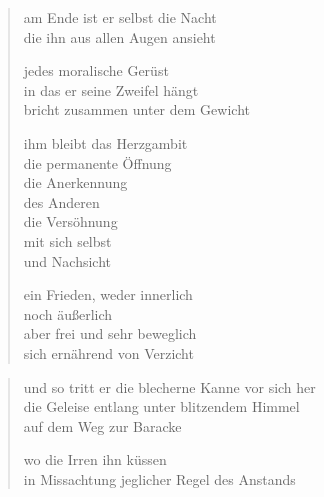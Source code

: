 {\begin{verse}
am Ende ist er selbst die Nacht\\
die ihn aus allen Augen ansieht

jedes moralische Gerüst\\
in das er seine Zweifel hängt\\
bricht zusammen unter dem Gewicht

ihm bleibt das Herzgambit\\
die permanente Öffnung\\
die Anerkennung\\
des Anderen\\
die Versöhnung\\
mit sich selbst\\
und Nachsicht

ein Frieden, weder innerlich\\
noch äußerlich\\
aber frei und sehr beweglich\\
sich ernährend von Verzicht
\end{verse}

\begin{verse}
und so tritt er die blecherne Kanne vor sich her\\
die Geleise entlang unter blitzendem Himmel\\
auf dem Weg zur Baracke

wo die Irren ihn küssen\\
in Missachtung jeglicher Regel des Anstands
\end{verse}

}

\clearpage

